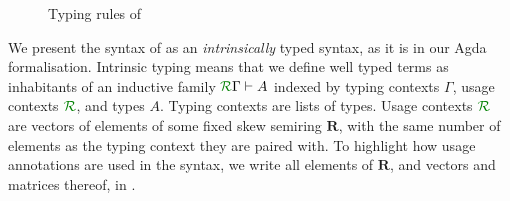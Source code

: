 \documentclass[submission,copyright,creativecommons]{eptcs}
\begin{document}
\begin{figure}
  \caption{Typing rules of \name{}}
  \label{fig:rules}
\end{figure}

We present the syntax of \name{} as an \emph{intrinsically} typed
syntax, as it is in our Agda formalisation. Intrinsic typing means
that we define well typed terms as inhabitants of an inductive family
$\ctx\Gamma{R} \vdash A$ indexed by typing contexts $\Gamma$, usage
contexts $\resctx{R}$, and types $A$. Typing contexts are lists of
types. Usage contexts $\resctx{R}$ are vectors of elements of some
fixed skew semiring $\mathbf R$, with the same number of elements as
the typing context they are paired with. To highlight how usage
annotations are used in the syntax, we write all elements of
$\mathbf R$, and vectors and matrices thereof, in .


\end{document}
